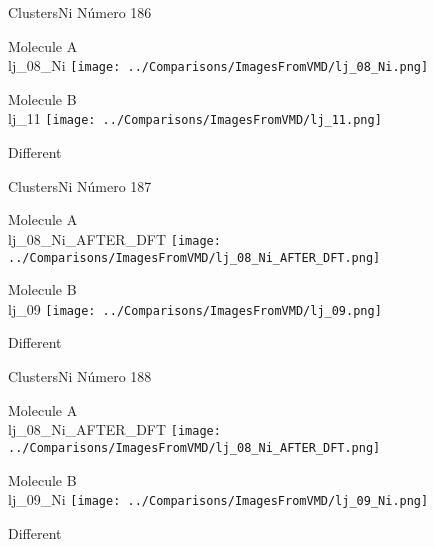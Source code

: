  \newpage

\vtab[-3cm]
\begin{center}
{\large ClustersNi \tab Número 186}
\end{center}
\begin{multicols}{2}
\begin{center}
Molecule A \\ 
lj\_08\_Ni
\texttt{[image: ../Comparisons/ImagesFromVMD/lj\_08\_Ni.png]}
\\
\vtab

\columnbreak
Molecule B \\ 
lj\_11
\texttt{[image: ../Comparisons/ImagesFromVMD/lj\_11.png]}
\\
\vtab


\end{center}
\end{multicols}
\begin{center}
\textcolor{NavyBlue}{\Large Different}
\end{center}

 \newpage

\vtab[-3cm]
\begin{center}
{\large ClustersNi \tab Número 187}
\end{center}
\begin{multicols}{2}
\begin{center}
Molecule A \\ 
lj\_08\_Ni\_AFTER\_DFT
\texttt{[image: ../Comparisons/ImagesFromVMD/lj\_08\_Ni\_AFTER\_DFT.png]}
\\
\vtab

\columnbreak
Molecule B \\ 
lj\_09
\texttt{[image: ../Comparisons/ImagesFromVMD/lj\_09.png]}
\\
\vtab


\end{center}
\end{multicols}
\begin{center}
\textcolor{NavyBlue}{\Large Different}
\end{center}

 \newpage

\vtab[-3cm]
\begin{center}
{\large ClustersNi \tab Número 188}
\end{center}
\begin{multicols}{2}
\begin{center}
Molecule A \\ 
lj\_08\_Ni\_AFTER\_DFT
\texttt{[image: ../Comparisons/ImagesFromVMD/lj\_08\_Ni\_AFTER\_DFT.png]}
\\
\vtab

\columnbreak
Molecule B \\ 
lj\_09\_Ni
\texttt{[image: ../Comparisons/ImagesFromVMD/lj\_09\_Ni.png]}
\\
\vtab


\end{center}
\end{multicols}
\begin{center}
\textcolor{NavyBlue}{\Large Different}
\end{center}

